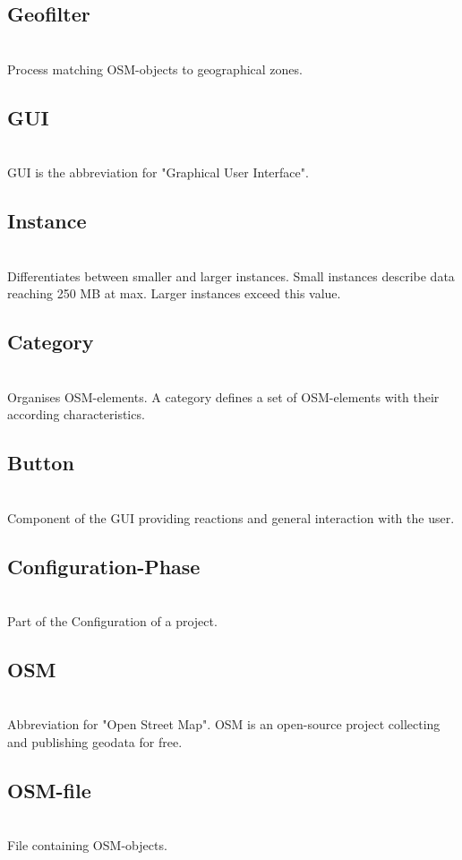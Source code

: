 \documentclass[parskip=full]{scrartcl} %
\begin{document}
\subsection*{Geofilter}\\
Process matching OSM-objects to geographical zones.

\subsection*{GUI}\\
GUI is the abbreviation for "Graphical User Interface".

\subsection{Instance}\\
Differentiates between smaller and larger instances. Small instances describe data reaching 250 MB at max. Larger instances exceed this value.

\subsection{Category}\\
Organises OSM-elements. A category defines a set of OSM-elements with their according characteristics.

\subsection{Button}\\
Component of the GUI providing reactions and general interaction with the user.

\subsection{Configuration-Phase}\\
Part of the Configuration of a project.

\subsection{OSM}\\
Abbreviation for "Open Street Map". OSM is an open-source project collecting and publishing geodata for free.

\subsection{OSM-file}\\
File containing OSM-objects.
\end{document}
